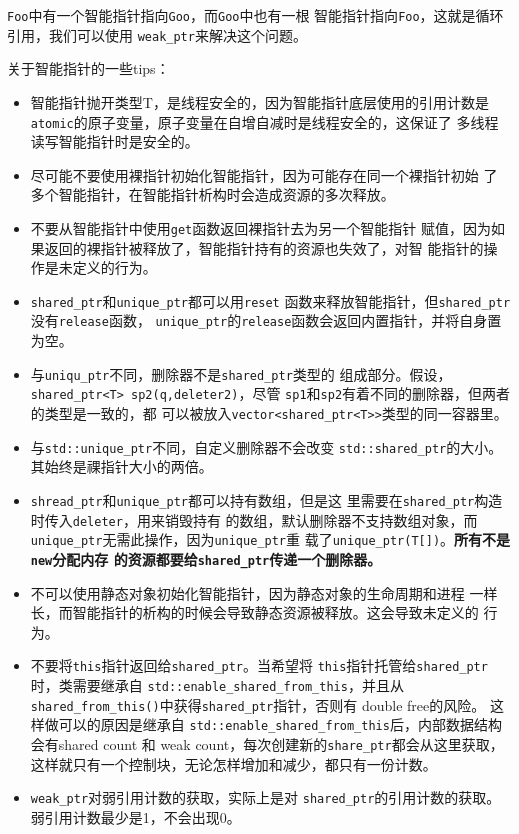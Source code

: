 \texttt{Foo}中有一个智能指针指向\texttt{Goo}，而\texttt{Goo}中也有一根
智能指针指向\texttt{Foo}，这就是循环引用，我们可以使用
\texttt{weak\_ptr}来解决这个问题。

关于智能指针的一些tips：
\begin{itemize}
\item 智能指针抛开类型T，是线程安全的，因为智能指针底层使用的引用计数是
\texttt{atomic}的原子变量，原子变量在自增自减时是线程安全的，这保证了
多线程读写智能指针时是安全的。
\item 尽可能不要使用裸指针初始化智能指针，因为可能存在同一个裸指针初始
  了多个智能指针，在智能指针析构时会造成资源的多次释放。
\item 不要从智能指针中使用\texttt{get}函数返回裸指针去为另一个智能指针
  赋值，因为如果返回的裸指针被释放了，智能指针持有的资源也失效了，对智
  能指针的操作是未定义的行为。
\item \texttt{shared\_ptr}和\texttt{unique\_ptr}都可以用\texttt{reset}
  函数来释放智能指针，但\texttt{shared\_ptr}没有\texttt{release}函数，
  \texttt{unique\_ptr}的\texttt{release}函数会返回内置指针，并将自身置
  为空。
\item 与\texttt{uniqu\_ptr}不同，删除器不是\texttt{shared\_ptr}类型的
  组成部分。假设，\texttt{shared\_ptr<T> sp2(q,deleter2)}，尽管
  \texttt{sp1}和\texttt{sp2}有着不同的删除器，但两者的类型是一致的，都
  可以被放入\texttt{vector<shared\_ptr<T>>}类型的同一容器里。
\item 与\texttt{std::unique\_ptr}不同，自定义删除器不会改变
  \texttt{std::shared\_ptr}的大小。其始终是祼指针大小的两倍。
\item \texttt{shread\_ptr}和\texttt{unique\_ptr}都可以持有数组，但是这
  里需要在\texttt{shared\_ptr}构造时传入\texttt{deleter}，用来销毁持有
  的数组，默认删除器不支持数组对象，而\texttt{unique\_ptr}无需此操作，因为\texttt{unique\_ptr}重
  载了\texttt{unique\_ptr(T[])}。\textbf{所有不是\texttt{new}分配内存
    的资源都要给\texttt{shared\_ptr}传递一个删除器。}
\item 不可以使用静态对象初始化智能指针，因为静态对象的生命周期和进程
  一样长，而智能指针的析构的时候会导致静态资源被释放。这会导致未定义的
  行为。
\item 不要将\texttt{this}指针返回给\texttt{shared\_ptr}。当希望将
  \texttt{this}指针托管给\texttt{shared\_ptr}时，类需要继承自
  \texttt{std::enable\_shared\_from\_this}，并且从
  \texttt{shared\_from\_this()}中获得\texttt{shared\_ptr}指针，否则有
  double free的风险。 这样做可以的原因是继承自
  \texttt{std::enable\_shared\_from\_this}后，内部数据结构会有shared
  count 和 weak count，每次创建新的\texttt{share\_ptr}都会从这里获取，
  这样就只有一个控制块，无论怎样增加和减少，都只有一份计数。
\item \texttt{weak\_ptr}对弱引用计数的获取，实际上是对
  \texttt{shared\_ptr}的引用计数的获取。弱引用计数最少是1，不会出现0。
\end{itemize}

